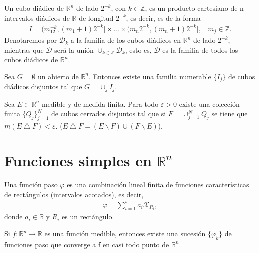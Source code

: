 \begin{defi}
    Un cubo diádico de $\mathbb{R}^n$ de lado $2^{-k}$, con $k \in \mathbb{Z}$, es un producto cartesiano de n intervalos diádicos de $\mathbb{R}$ de longitud $2^{-k}$, es decir, es de la forma
    \begin{align*}
        I = (m_12^{-k}, (m_1 + 1)2^{-k}] \times ... \times (m_n2^{-k}, (m_n + 1)2^{-k}], \ \ \ \ m_j \in \mathbb{Z}.
    \end{align*}
    Denotaremos por $\mathcal{D}_k$ a la familia de los cubos diádicos en $\mathbb{R}^n$ de lado $2^{-k}$, mientras que $\mathcal{D}$ será la unión $\cup_{k \in \mathbb{Z}}{\mathcal{D}_k}$, esto es, $\mathcal{D}$ es la familia de todos los cubos diádicos de $\mathbb{R}^n$.
\end{defi}

\begin{teo}
    Sea $G = \emptyset$ un abierto de $\mathbb{R}^n$. Entonces existe una familia numerable $\{I_j\}$ de cubos diádicos disjuntos tal que $G = \cup_{j}{I_j}$.
\end{teo}

\begin{teo}
    Sea $E \subset \mathbb{R}^n$ medible y de medida finita. Para todo $\varepsilon > 0$ existe una colección finita $\{Q_j\}_{j=1}^{N}$ de cubos cerrados disjuntos tal que si $F = \cup_{j=1}^{N}{Q_j}$ se tiene que $m(E \bigtriangleup F) < \varepsilon$. ($E \bigtriangleup F = (E \backslash F) \cup (F \backslash E))$.
\end{teo}

\section{Funciones simples en $\mathbb{R}^n$}

\begin{defi}
    Una función paso $\varphi$ es una combinación lineal finita de funciones características de rectángulos (intervalos acotados), es decir,
    \begin{align*}
        \varphi = \sum_{i=1}^{s}{a_i\mathcal{X}_{R_i}},
    \end{align*}
    donde $a_i \in \mathbb{R}$ y $R_i$ es un rectángulo.
\end{defi}

\begin{teo}
    Si $f: \mathbb{R}^n \longrightarrow \mathbb{R}$ es una función medible, entonces existe una sucesión $\{\varphi_k\}$ de funciones paso que converge a f en casi todo punto de $\mathbb{R}^n$.
\end{teo}

